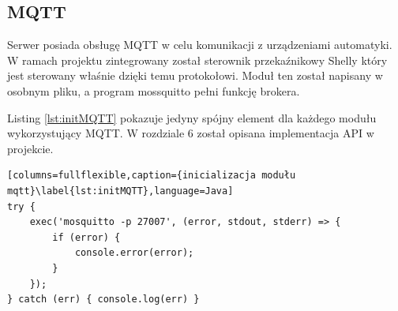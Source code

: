 \subsection{MQTT}
Serwer posiada obsługę MQTT w celu komunikacji z urządzeniami automatyki. W ramach projektu zintegrowany został sterownik przekaźnikowy Shelly który jest sterowany właśnie dzięki temu protokołowi. Moduł ten został napisany w osobnym pliku, a program mossquitto pełni funkcję brokera.
\par Listing \ref{lst:initMQTT} pokazuje jedyny spójny element dla każdego modułu wykorzystujący MQTT. W rozdziale 6 został opisana implementacja API w projekcie.

\begin{lstlisting}[columns=fullflexible,caption={inicializacja modułu mqtt}\label{lst:initMQTT},language=Java]
try {
	exec('mosquitto -p 27007', (error, stdout, stderr) => {
		if (error) {
			console.error(error);
		}
	});
} catch (err) { console.log(err) }
\end{lstlisting}
